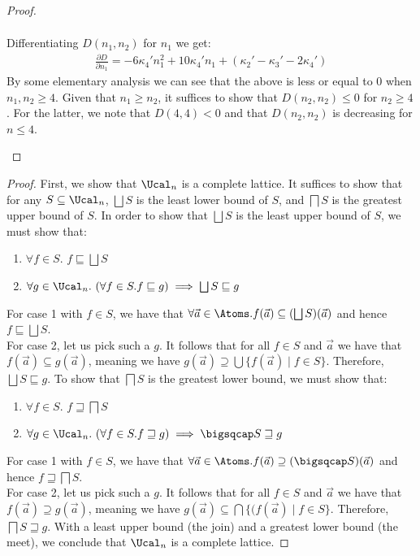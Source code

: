 \begin{proof}
\begin{enumerate}
\begin{align*}
\end{align*}
Differentiating $D(n_1,n_2)$ for $n_1$ we get:
\begin{align*}
\frac{\partial D}{\partial n_1}= -6\kappa_4'n_1^2+10\kappa_4'n_1+(\kappa_2'-\kappa_3'-2\kappa_4')
\end{align*}
By some elementary analysis we can see that the above is less or equal to 0 when $n_1,n_2\geq 4$. Given that $n_1\geq n_2$, it suffices to show that $D(n_2,n_2)\leq 0$ for $n_2\geq 4$. For the latter, we note that $D(4,4)< 0$ and that $D(n_2,n_2)$ is decreasing for $n\leq4$.
\end{enumerate}
\end{proof}


\completelattice*
\begin{proof}
	First, we show that $\Ucal_n$ is a complete lattice. 
	It suffices to show that for any $S\subseteq \Ucal_n$, $\bigsqcup S$ is the least lower bound of $S$, and $\bigsqcap S$ is the greatest upper bound of $S$. In order to show that $\bigsqcup S$ is the least upper bound of $S$, we must show that:
 \begin{enumerate}
		\item $\forall f\in S$. $f\sqsubseteq \bigsqcup S$
		\item $\forall g\in \Ucal_n.\ (\forall f\in S. f\sqsubseteq g)\implies\bigsqcup S \sqsubseteq g$
	\end{enumerate}
 	For case 1 with $f\in S$, we have that $\forall \vec a\in\Atoms. f(\vec a) \subseteq (\bigsqcup S)(\vec a)$
	and hence $f\sqsubseteq \bigsqcup S$.\\
	  	For case 2, let us pick such a $g$. It follows that for all $f\in S$ and $\vec a$ we have that $f(\vec a) \subseteq g(\vec a)$,
	meaning we have $g(\vec a) \supseteq \bigcup \{f(\vec a) \mid f \in S\}$.
	Therefore, $\bigsqcup S \sqsubseteq g$.
	To show that $\bigsqcap S$ is the greatest lower bound, we must show that:
	\begin{enumerate}
		\item $\forall f\in S$. $f\sqsupseteq \bigsqcap S$
		\item $\forall g\in \Ucal_n.\ (\forall f\in S. f\sqsupseteq g)\implies\bigsqcap S \sqsupseteq g$
	\end{enumerate}
	For case 1 with $f\in S$, we have that $\forall \vec a\in\Atoms. f(\vec a)\supseteq (\bigsqcap S)(\vec a)$ and hence $f\sqsupseteq \bigsqcap S$.\\
	For case 2, let us pick such a $g$. It follows that for all $f \in S$ and $\vec a$ we have that $f(\vec a)\supseteq g(\vec a)$, meaning we have $g(\vec a) \subseteq \bigcap\{(f(\vec a)\mid f \in S\}$. Therefore, $\bigsqcap S \sqsupseteq g$.     
	With a least upper bound (the join) and a greatest lower bound (the meet), we conclude that $\Ucal_n$ is a complete lattice. 
	

\end{proof}
